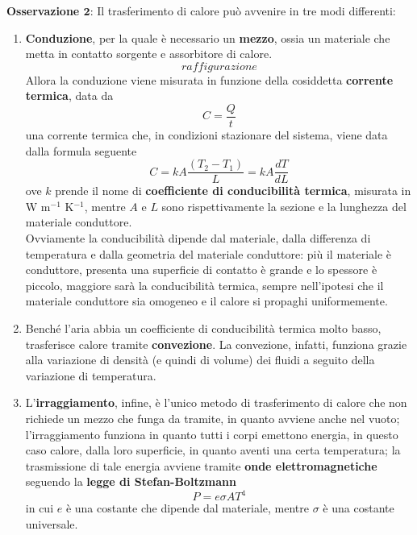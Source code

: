\documentclass[a4paper]{extarticle}
\begin{document}
\vspace{1em}
\noindent
\textbf{Osservazione $\boldsymbol{2}$}: Il trasferimento di calore può avvenire in tre modi differenti:
\begin{enumerate}
  \item \textbf{Conduzione}, per la quale è necessario un \textbf{mezzo}, ossia un materiale che metta in contatto sorgente e assorbitore di calore.
  \[raffigurazione\]
  Allora la conduzione viene misurata in funzione della cosiddetta \textbf{corrente termica}, data da
  \[C=\frac{Q}{t}\]
  una corrente termica che, in condizioni stazionare del sistema, viene data dalla formula seguente
  \[\boxed{C=k A \frac{(T_2-T_1)}{L} = k A \frac{dT}{dL}}\]
  ove $k$ prende il nome di \textbf{coefficiente di conducibilità termica}, misurata in W m$^{-1}$ K$^{-1}$, mentre $A$ e $L$ sono rispettivamente la sezione e la lunghezza del materiale conduttore.\\
  Ovviamente la conducibilità dipende dal materiale, dalla differenza di temperatura e dalla geometria del materiale conduttore: più il materiale è conduttore, presenta una superficie di contatto è grande e lo spessore è piccolo, maggiore sarà la conducibilità termica, sempre nell'ipotesi che il materiale conduttore sia omogeneo e il calore si propaghi uniformemente.

  \item Benché l'aria abbia un coefficiente di conducibilità termica molto basso, trasferisce calore tramite \textbf{convezione}. La convezione, infatti, funziona grazie alla variazione di densità (e quindi di volume) dei fluidi a seguito della variazione di temperatura.

  \item L'\textbf{irraggiamento}, infine, è l'unico metodo di trasferimento di calore che non richiede un mezzo che funga da tramite, in quanto avviene anche nel vuoto; l'irraggiamento funziona in quanto tutti i corpi emettono energia, in questo caso calore, dalla loro superficie, in quanto aventi una certa temperatura; la trasmissione di tale energia avviene tramite \textbf{onde elettromagnetiche} seguendo la \textbf{legge di Stefan-Boltzmann}
  \[\boxed{P=e \sigma A T^4}\]
  in cui $e$ è una costante che dipende dal materiale, mentre $\sigma$ è una costante universale.
\end{enumerate}
\end{document}

